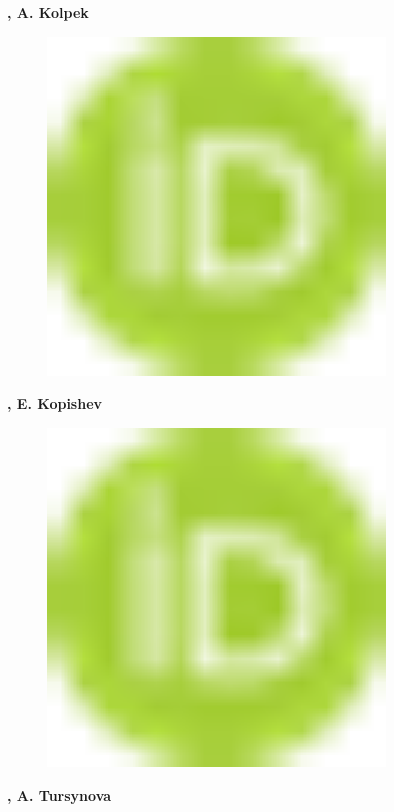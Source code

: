 {\bfseries , A.
Kolpek}
\begin{figure}[H]
	\centering
	\includegraphics[width=0.8\textwidth]{media/chem2/image1}
	\caption*{}
\end{figure}
{\bfseries ,
E.
Kopishev}
\begin{figure}[H]
	\centering
	\includegraphics[width=0.8\textwidth]{media/chem2/image1}
	\caption*{}
\end{figure}
{\bfseries ,
A.
Tursynova}
